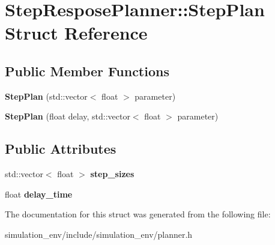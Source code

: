 \hypertarget{structStepResposePlanner_1_1StepPlan}{}\section{Step\+Respose\+Planner\+:\+:Step\+Plan Struct Reference}
\label{structStepResposePlanner_1_1StepPlan}
\subsection*{Public Member Functions}
\begin{DoxyCompactItemize}
\item 
{\bfseries Step\+Plan} (std\+::vector$<$ float $>$ parameter)\hypertarget{structStepResposePlanner_1_1StepPlan_aede87fc069ba7e25ca148719ac28f68a}{}\label{structStepResposePlanner_1_1StepPlan_aede87fc069ba7e25ca148719ac28f68a}

\item 
{\bfseries Step\+Plan} (float delay, std\+::vector$<$ float $>$ parameter)\hypertarget{structStepResposePlanner_1_1StepPlan_ac5edeb9dfe1c66e8bf147198f70fb5ae}{}\label{structStepResposePlanner_1_1StepPlan_ac5edeb9dfe1c66e8bf147198f70fb5ae}

\end{DoxyCompactItemize}
\subsection*{Public Attributes}
\begin{DoxyCompactItemize}
\item 
std\+::vector$<$ float $>$ {\bfseries step\+\_\+sizes}\hypertarget{structStepResposePlanner_1_1StepPlan_afca5a2237ca3a290cb551f3189d578ef}{}\label{structStepResposePlanner_1_1StepPlan_afca5a2237ca3a290cb551f3189d578ef}

\item 
float {\bfseries delay\+\_\+time}\hypertarget{structStepResposePlanner_1_1StepPlan_ae532a987989c76a84f5e19b248c7cd9a}{}\label{structStepResposePlanner_1_1StepPlan_ae532a987989c76a84f5e19b248c7cd9a}

\end{DoxyCompactItemize}


The documentation for this struct was generated from the following file\+:\begin{DoxyCompactItemize}
\item 
simulation\+\_\+env/include/simulation\+\_\+env/planner.\+h\end{DoxyCompactItemize}
